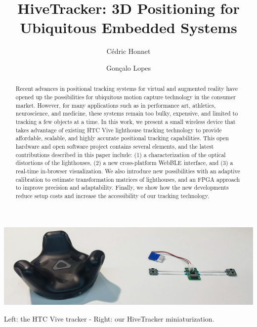 \documentclass[sigchi]{acmart}
\begin{document}
\title{HiveTracker: 3D Positioning for Ubiquitous Embedded Systems}

\author{C\'edric Honnet}

\author{Gon\c{c}alo Lopes}

\begin{teaserfigure}
\centering
\includegraphics[width=1.0\columnwidth]{Figures/banner.jpg}
\caption{Left: the HTC Vive tracker - Right: our HiveTracker miniaturization.}
\label{Fig:Banner}
\end{teaserfigure}

\begin{abstract}
Recent advances in positional tracking systems for virtual and augmented reality have opened up the possibilities for ubiquitous motion capture technology in the consumer market. However, for many applications such as in performance art, athletics, neuroscience, and medicine, these systems remain too bulky, expensive, and limited to tracking a few objects at a time. In this work, we present a small wireless device that takes advantage of existing HTC Vive lighthouse tracking technology to provide affordable, scalable, and highly accurate positional tracking capabilities. This open hardware and open software project contains several elements, and the latest contributions described in this paper include: (1) a characterization of the optical distortions of the lighthouses, (2) a new cross-platform WebBLE interface, and (3) a real-time in-browser visualization. We also introduce new possibilities with an adaptive calibration to estimate transformation matrices of lighthouses, and an FPGA approach to improve precision and adaptability. Finally, we show how the new developments reduce setup costs and increase the accessibility of our tracking technology.
\end{abstract}
\end{document}
